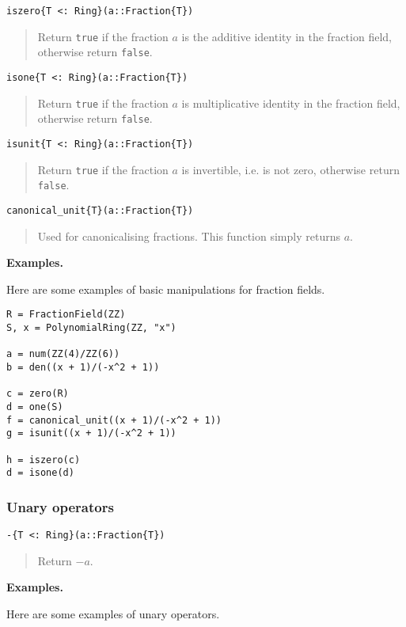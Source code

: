 \documentclass[a4paper,10pt]{article}
\newcommand{\code}{\lstinline}
\newcommand{\desc}[1]{\vspace{-3mm}\begin{quote}#1\end{quote}}
\begin{document}
{{{\begin{lstlisting}
iszero{T <: Ring}(a::Fraction{T})
\end{lstlisting}

\desc{Return \code{true} if the fraction $a$ is the additive identity in the
fraction field, otherwise return \code{false}.}

\begin{lstlisting}
isone{T <: Ring}(a::Fraction{T})
\end{lstlisting}

\desc{Return \code{true} if the fraction $a$ is multiplicative identity in the
fraction field, otherwise return \code{false}.}

\begin{lstlisting}
isunit{T <: Ring}(a::Fraction{T})
\end{lstlisting}

\desc{Return \code{true} if the fraction $a$ is invertible, i.e. is not zero,
otherwise return \code{false}.}

\begin{lstlisting}
canonical_unit{T}(a::Fraction{T})
\end{lstlisting}

\desc{Used for canonicalising fractions. This function simply returns $a$.}

\textbf{Examples.}

Here are some examples of basic manipulations for fraction fields.

\begin{lstlisting}
R = FractionField(ZZ)
S, x = PolynomialRing(ZZ, "x")

a = num(ZZ(4)/ZZ(6))
b = den((x + 1)/(-x^2 + 1))

c = zero(R)
d = one(S)
f = canonical_unit((x + 1)/(-x^2 + 1))
g = isunit((x + 1)/(-x^2 + 1))

h = iszero(c)
d = isone(d)
\end{lstlisting}

\subsubsection{Unary operators}

\begin{lstlisting}
-{T <: Ring}(a::Fraction{T})
\end{lstlisting}

\desc{Return $-a$.}

\textbf{Examples.}

Here are some examples of unary operators.

}}}
\end{document}
